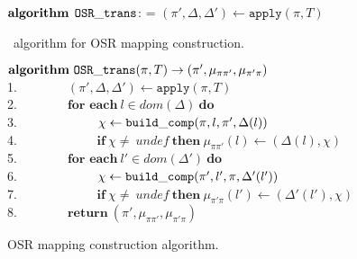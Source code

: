 \ifdefined\noauthorea
\begin{figure}[ht!]
\IncMargin{2em}
\begin{algorithm}[H]
\DontPrintSemicolon
\LinesNumbered
\SetAlgoNoLine
\SetNlSkip{1em} 
\Indm\Indmm
\hrulefill\\
\nonl\vspace{-2mm}\hrulefill\\
\nonl$\mathbf{algorithm} \> \> \text{${\tt OSR\_trans}$}$:\;
\everypar={\nl}
\Indp\Indpp
\vspace{1mm} $(\pi',\Delta,\Delta')\gets \texttt{apply}(\pi,T)$\;
\vspace{-2mm}
\Indm\Indmm
\nonl\hrulefill\vspace{1mm}\\
\DecMargin{0.5em}
\caption{\label{fig:osr-trans} \osrtrans\ algorithm for OSR mapping construction.}
\IncMargin{0.5em}
\end{algorithm}
 
\end{figure}

\else
\begin{figure}
\noindent
\begin{small}
\hphantom{xxx} $\textbf{algorithm}~\text{${\tt OSR\_trans}$}(\pi, T)\rightarrow (\pi',\mu_{\pi\pi'},\mu_{\pi'\pi})$ \\
1. ~~ ~~~~ $(\pi',\Delta,\Delta')\gets \texttt{apply}(\pi,T)$ \\
2. ~~ ~~~~ $\textbf{for each}~l\in dom(\Delta)~\textbf{do}$ \\
3. ~~ ~~~~ ~~~~ $\chi\gets\text{${\tt build\_comp}$}(\pi,l,\pi',\Delta(l))$ \\
4. ~~ ~~~~ ~~~~ $\textbf{if}~\chi\neq~undef~\textbf{then}~\mu_{\pi\pi'}(l)\gets(\Delta(l),\chi)$ \\
5. ~~ ~~~~ $\textbf{for each}~l'\in dom(\Delta')~\textbf{do}$ \\
6. ~~ ~~~~ ~~~~ $\chi\gets\text{${\tt build\_comp}$}(\pi',l',\pi,\Delta'(l'))$ \\
7. ~~ ~~~~ ~~~~ $\textbf{if}~\chi\neq~undef~\textbf{then}~\mu_{\pi'\pi}(l')\gets(\Delta'(l'),\chi)$ \\
8. ~~ ~~~~ $\textbf{return}~(\pi',\mu_{\pi\pi'},\mu_{\pi'\pi})$ \\
\end{small}
\caption{OSR mapping construction algorithm.}
\label{fig:osr-trans}
\end{figure}
\fi
